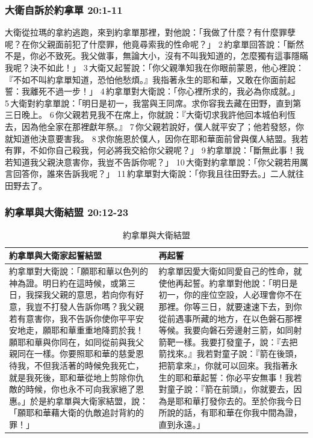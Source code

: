 \subsubsection{大衛自訴於約拿單 20:1-11}
大衛從拉瑪的拿約逃跑，來到約拿單那裡，對他說：「我做了什麼？有什麼罪孽呢？在你父親面前犯了什麼罪，他竟尋索我的性命呢？」 2 約拿單回答說：「斷然不是，你必不致死。我父做事，無論大小，沒有不叫我知道的，怎麼獨有這事隱瞞我呢？決不如此！」 3 大衛又起誓說：「你父親準知我在你眼前蒙恩，他心裡說：『不如不叫約拿單知道，恐怕他愁煩。』我指著永生的耶和華，又敢在你面前起誓：我離死不過一步！」 4 約拿單對大衛說：「你心裡所求的，我必為你成就。」 5 大衛對約拿單說：「明日是初一，我當與王同席。求你容我去藏在田野，直到第三日晚上。 6 你父親若見我不在席上，你就說：『大衛切求我許他回本城伯利恆去，因為他全家在那裡獻年祭。』 7 你父親若說好，僕人就平安了；他若發怒，你就知道他決意要害我。 8 求你施恩於僕人，因你在耶和華面前曾與僕人結盟。我若有罪，不如你自己殺我，何必將我交給你父親呢？」 9 約拿單說：「斷無此事！我若知道我父親決意害你，我豈不告訴你呢？」 10 大衛對約拿單說：「你父親若用厲言回答你，誰來告訴我呢？」 11 約拿單對大衛說：「你我且往田野去。」二人就往田野去了。

\subsubsection{約拿單與大衛結盟 20:12-23}
\begin{table}[H]
\centering 
\begin{tabular}{p{8.2cm}|p{8.75cm}}\hline\hline
約拿單與大衛家起誓結盟&再起誓\\\hline
約拿單對大衛說：「願耶和華以色列的神為證。明日約在這時候，或第三日，我探我父親的意思，若向你有好意，我豈不打發人告訴你嗎？我父親若有意害你，我不告訴你使你平平安安地走，願耶和華重重地降罰於我！願耶和華與你同在，如同從前與我父親同在一樣。你要照耶和華的慈愛恩待我，不但我活著的時候免我死亡，就是我死後，耶和華從地上剪除你仇敵的時候，你也永不可向我家絕了恩惠。」於是約拿單與大衛家結盟，說：「願耶和華藉大衛的仇敵追討背約的罪！」
&約拿單因愛大衛如同愛自己的性命，就使他再起誓。約拿單對他說：「明日是初一，你的座位空設，人必理會你不在那裡。你等三日，就要速速下去，到你從前遇事所藏的地方，在以色磐石那裡等候。我要向磐石旁邊射三箭，如同射箭靶一樣。我要打發童子，說：『去把箭找來。』我若對童子說：『箭在後頭，把箭拿來』，你就可以回來。我指著永生的耶和華起誓：你必平安無事！我若對童子說：『箭在前頭』，你就要去，因為是耶和華打發你去的。至於你我今日所說的話，有耶和華在你我中間為證，直到永遠。」\\\hline
\end{tabular}
\caption{約拿單與大衛結盟}
\end{table}

